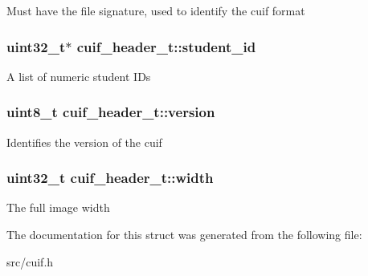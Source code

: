 Must have the file signature, used to identify the cuif format \hypertarget{structcuif__header__t_a8a736a8272758a247d99831c5dcb669b}{
\subsubsection[{student\+\_\+id}]{\setlength{\rightskip}{0pt plus 5cm}uint32\+\_\+t$\ast$ cuif\+\_\+header\+\_\+t\+::student\+\_\+id}}\label{structcuif__header__t_a8a736a8272758a247d99831c5dcb669b}
A list of numeric student I\+Ds \hypertarget{structcuif__header__t_a3d18b895c448a38a4e8c5982fac5122e}{
\subsubsection[{version}]{\setlength{\rightskip}{0pt plus 5cm}uint8\+\_\+t cuif\+\_\+header\+\_\+t\+::version}}\label{structcuif__header__t_a3d18b895c448a38a4e8c5982fac5122e}
Identifies the version of the cuif \hypertarget{structcuif__header__t_afd0bb120ea431d8cea9dc53885a915cc}{
\subsubsection[{width}]{\setlength{\rightskip}{0pt plus 5cm}uint32\+\_\+t cuif\+\_\+header\+\_\+t\+::width}}\label{structcuif__header__t_afd0bb120ea431d8cea9dc53885a915cc}
The full image width 

The documentation for this struct was generated from the following file\+:\begin{DoxyCompactItemize}
\item 
src/cuif.\+h\end{DoxyCompactItemize}
